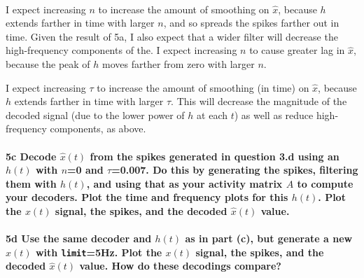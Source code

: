 \documentclass{article}
\begin{document}
{    \begin{center}
    \end{center}
    { \hspace*{\fill} \\}
    
    I expect increasing \(n\) to increase the amount of smoothing on
\(\hat{x}\), because \(h\) extends farther in time with larger \(n\),
and so spreads the spikes farther out in time. Given the result of 5a, I
also expect that a wider filter will decrease the high-frequency
components of the. I expect increasing \(n\) to cause greater lag in
\(\hat{x}\), because the peak of \(h\) moves farther from zero with
larger \(n\).

    I expect increasing \(\tau\) to increase the amount of smoothing (in
time) on \(\hat{x}\), because \(h\) extends farther in time with larger
\(\tau\). This will decrease the magnitude of the decoded signal (due to
the lower power of \(h\) at each \(t\)) as well as reduce high-frequency
components, as above.

    \paragraph{\texorpdfstring{5c Decode \(\hat{x}(t)\) from the spikes
generated in question 3.d using an \(h(t)\) with \(n\)=0 and
\(\tau\)=0.007. Do this by generating the spikes, filtering them with
\(h(t)\), and using that as your activity matrix \(A\) to compute your
decoders. Plot the time and frequency plots for this \(h(t)\). Plot the
\(x(t)\) signal, the spikes, and the decoded \(\hat{x}(t)\)
value.}{5c Decode \textbackslash{}hat\{x\}(t) from the spikes generated in question 3.d using an h(t) with n=0 and \textbackslash{}tau=0.007. Do this by generating the spikes, filtering them with h(t), and using that as your activity matrix A to compute your decoders. Plot the time and frequency plots for this h(t). Plot the x(t) signal, the spikes, and the decoded \textbackslash{}hat\{x\}(t) value.}}\label{c-decode-hatxt-from-the-spikes-generated-in-question-3.d-using-an-ht-with-n0-and-tau0.007.-do-this-by-generating-the-spikes-filtering-them-with-ht-and-using-that-as-your-activity-matrix-a-to-compute-your-decoders.-plot-the-time-and-frequency-plots-for-this-ht.-plot-the-xt-signal-the-spikes-and-the-decoded-hatxt-value.}

    \paragraph{\texorpdfstring{5d Use the same decoder and \(h(t)\) as in
part (c), but generate a new \(x(t)\) with \texttt{limit}=5Hz. Plot the
\(x(t)\) signal, the spikes, and the decoded \(\hat{x}(t)\) value. How
do these decodings
compare?}{5d Use the same decoder and h(t) as in part (c), but generate a new x(t) with limit=5Hz. Plot the x(t) signal, the spikes, and the decoded \textbackslash{}hat\{x\}(t) value. How do these decodings compare?}}\label{d-use-the-same-decoder-and-ht-as-in-part-c-but-generate-a-new-xt-with-limit5hz.-plot-the-xt-signal-the-spikes-and-the-decoded-hatxt-value.-how-do-these-decodings-compare}

}
\end{document}
